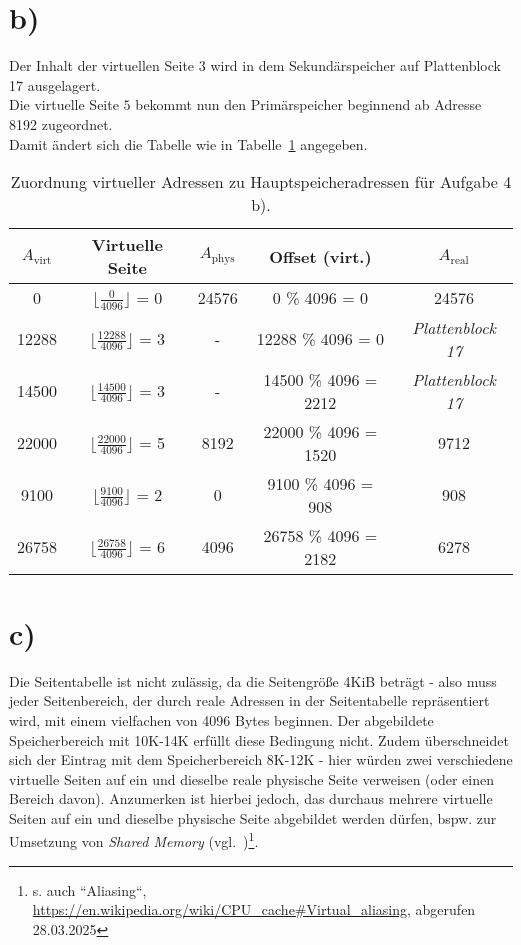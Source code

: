 \section{b)}
Der Inhalt der virtuellen Seite $3$ wird in dem Sekundärspeicher auf Plattenblock 17 ausgelagert.\\
Die virtuelle Seite $5$ bekommt nun den Primärspeicher beginnend ab Adresse 8192 zugeordnet.\\
Damit ändert sich die Tabelle wie in  Tabelle~\ref{tab:adresszuordnung_b} angegeben.

\begin{table}[h!]
    \setlength{\tabcolsep}{0.5em}
    \def\arraystretch{1.5}
    \centering
    \begin{tabular}{|c|c|c|c|c|}
        \hline
        $A_{\text{virt}}$ & Virtuelle Seite              & $A_{\text{phys}}$ &  Offset (virt.) & $A_{\text{real}}$\\
        \hline
        0     & $\lfloor \frac{0}{4096} \rfloor$ = 0      & 24576 & 0 \% 4096     = 0     & 24576 \\
        \hline
        12288 & $\lfloor \frac{12288}{4096} \rfloor$ = 3  & -     & 12288 \% 4096 = 0     & \textit{Plattenblock 17} \\
        \hline
        14500  & $\lfloor \frac{14500}{4096} \rfloor$ = 3 & - & 14500 \% 4096 = 2212   & \textit{Plattenblock 17} \\
        \hline
        22000  & $\lfloor \frac{22000}{4096} \rfloor$ = 5 & 8192    & 22000 \% 4096 = 1520   & 9712  \\
        \hline
        9100   & $\lfloor \frac{9100}{4096} \rfloor$ = 2  & 0    & 9100 \% 4096 = 908     & 908\\
        \hline
        26758  & $\lfloor \frac{26758}{4096} \rfloor$ = 6 & 4096 & 26758 \% 4096 = 2182   & 6278 \\
        \hline
    \end{tabular}
    \caption{Zuordnung virtueller Adressen zu Hauptspeicheradressen für Aufgabe 4 b). }
    \label{tab:adresszuordnung_b}
\end{table}

\section{c)}

Die Seitentabelle ist nicht zulässig, da die Seitengröße 4KiB beträgt - also muss jeder Seitenbereich, der durch reale Adressen in der Seitentabelle repräsentiert wird, mit einem vielfachen von 4096 Bytes beginnen.
Der abgebildete Speicherbereich mit 10K-14K erfüllt diese Bedingung nicht.
Zudem überschneidet sich der Eintrag mit dem Speicherbereich 8K-12K - hier würden zwei verschiedene virtuelle Seiten auf ein und dieselbe reale physische Seite verweisen (oder einen Bereich davon).
Anzumerken ist hierbei jedoch, das durchaus mehrere virtuelle Seiten auf ein und dieselbe physische Seite abgebildet werden dürfen, bspw. zur Umsetzung von \textit{Shared Memory} (vgl.~\cite[\textbf{Abb. 7.38}, 226]{Man20h})\footnote{
s. auch ``Aliasing``, \url{https://en.wikipedia.org/wiki/CPU_cache#Virtual_aliasing}, abgerufen 28.03.2025
}.